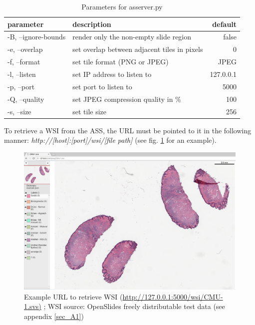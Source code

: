 \begin{table}[H]
	\begin{center}
		\begin{tabular}{| l | l | r |}
			\hline
			\textbf{parameter} & \textbf{description} & \textbf{default}\\ \hline
			-B, --ignore-bounds & render only the non-empty slide region & false\\ \hline
			-e, --overlap & set overlap between adjacent tiles in pixels & 0 \\ \hline
			-f, --format & set tile format (PNG or JPEG) & JPEG \\ \hline
			-l, --listen & set IP address to listen to & 127.0.0.1\\ \hline
			-p, --port & set port to listen to & 5000\\ \hline
			-Q, --quality & set JPEG compression quality in \% & 100\\ \hline
			-s, --size & set tile size & 256\\ \hline
		\end{tabular}
		\caption{Parameters for as{\textunderscore}server.py}
		\label{tab4_assParams}
	\end{center}
\end{table}

To retrieve a WSI from the ASS, the URL must be pointed to it in the following manner: \emph{http://[host]:[port]/wsi/[file path]} (see fig. \ref{fig4_wsiUrl} for an example).

\begin{figure}[H]
	\begin{center}
		\includegraphics[scale=0.2]{img/wsiUrl.png}
		\caption{Example URL to retrieve WSI (\url{http://127.0.0.1:5000/wsi/CMU-1.svs)}
		\label{fig4_wsiUrl}; WSI source: OpenSlides freely distributable test data (see appendix \ref{sec_A1})}
	\end{center}
\end{figure}


